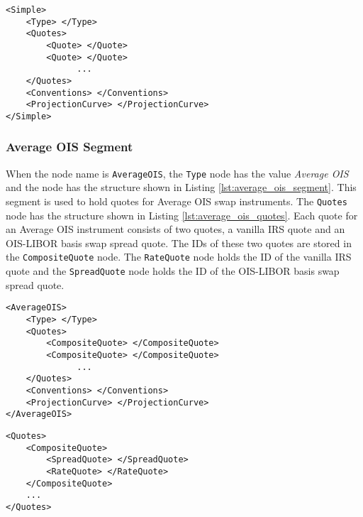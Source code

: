 \begin{lstlisting}[caption=Simple yield curve segment, label=lst:simple_segment]
<Simple>
	<Type> </Type>
	<Quotes>
		<Quote> </Quote>
		<Quote> </Quote>
		      ...
	</Quotes>
	<Conventions> </Conventions>
	<ProjectionCurve> </ProjectionCurve>
</Simple>
\end{lstlisting}

\subsubsection*{Average OIS Segment}
When the node name is \lstinline!AverageOIS!, the \lstinline!Type! node has the value \emph{Average OIS} and the node has 
the structure shown in Listing \ref{lst:average_ois_segment}. This segment is used to hold quotes for Average OIS swap 
instruments. The \lstinline!Quotes! node has the structure shown in Listing \ref{lst:average_ois_quotes}. Each quote for 
an Average OIS instrument consists of two quotes, a vanilla IRS quote and an OIS-LIBOR basis swap spread quote. The IDs of 
these two quotes are stored in the \lstinline!CompositeQuote! node. The \lstinline!RateQuote! node holds the ID of the  
vanilla IRS quote and the \lstinline!SpreadQuote! node holds the ID of the OIS-LIBOR basis swap spread quote.

\begin{lstlisting}[caption=Average OIS yield curve segment, label=lst:average_ois_segment]
<AverageOIS>
	<Type> </Type>
	<Quotes>
		<CompositeQuote> </CompositeQuote>
		<CompositeQuote> </CompositeQuote>
		      ...
	</Quotes>
	<Conventions> </Conventions>
	<ProjectionCurve> </ProjectionCurve>
</AverageOIS>
\end{lstlisting}

\begin{lstlisting}[caption=Average OIS segment's quotes section, label=lst:average_ois_quotes]
<Quotes>
	<CompositeQuote>
		<SpreadQuote> </SpreadQuote>
		<RateQuote> </RateQuote>
	</CompositeQuote>
	...
</Quotes>
\end{lstlisting}

